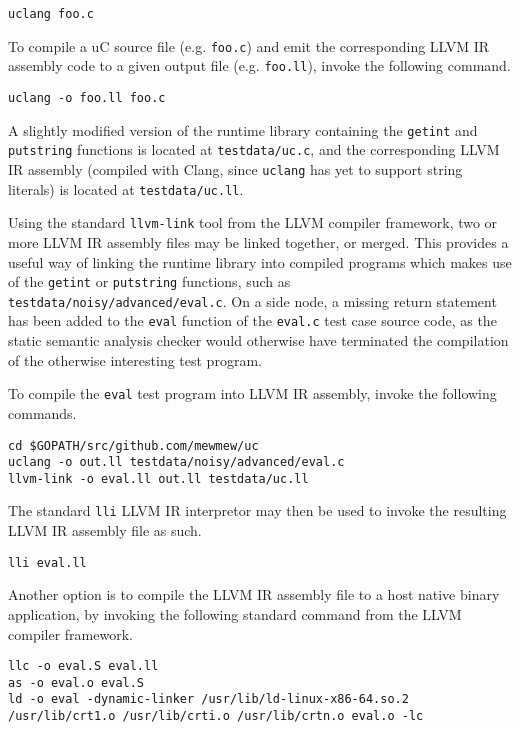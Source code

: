 \begin{verbatim}
uclang foo.c
\end{verbatim}

To compile a uC source file (e.g. \texttt{foo.c}) and emit the corresponding LLVM IR assembly code to a given output file (e.g. \texttt{foo.ll}), invoke the following command.

\begin{verbatim}
uclang -o foo.ll foo.c
\end{verbatim}

A slightly modified version of the runtime library containing the \texttt{getint} and \texttt{putstring} functions is located at \texttt{testdata/uc.c}, and the corresponding LLVM IR assembly (compiled with Clang, since \texttt{uclang} has yet to support string literals) is located at \texttt{testdata/uc.ll}.

Using the standard \texttt{llvm-link} tool from the LLVM compiler framework, two or more LLVM IR assembly files may be linked together, or merged. This provides a useful way of linking the runtime library into compiled programs which makes use of the \texttt{getint} or \texttt{putstring} functions, such as \texttt{testdata/noisy/advanced/eval.c}. On a side node, a missing return statement has been added to the \texttt{eval} function of the \texttt{eval.c} test case source code, as the static semantic analysis checker would otherwise have terminated the compilation of the otherwise interesting test program.

To compile the \texttt{eval} test program into LLVM IR assembly, invoke the following commands.

\begin{verbatim}
cd $GOPATH/src/github.com/mewmew/uc
uclang -o out.ll testdata/noisy/advanced/eval.c
llvm-link -o eval.ll out.ll testdata/uc.ll
\end{verbatim}

The standard \texttt{lli} LLVM IR interpretor may then be used to invoke the resulting LLVM IR assembly file as such.

\begin{verbatim}
lli eval.ll
\end{verbatim}

Another option is to compile the LLVM IR assembly file to a host native binary application, by invoking the following standard command from the LLVM compiler framework.

\begin{verbatim}
llc -o eval.S eval.ll
as -o eval.o eval.S
ld -o eval -dynamic-linker /usr/lib/ld-linux-x86-64.so.2 /usr/lib/crt1.o /usr/lib/crti.o /usr/lib/crtn.o eval.o -lc
\end{verbatim}


